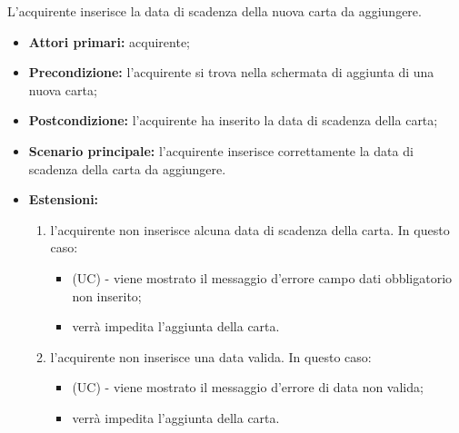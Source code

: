L'acquirente inserisce la data di scadenza della nuova carta da aggiungere.
\begin{itemize}
    \item \textbf{Attori primari:} acquirente;
    \item \textbf{Precondizione:} l'acquirente si trova nella schermata di aggiunta di una nuova carta;
    \item \textbf{Postcondizione:} l'acquirente ha inserito la data di scadenza della carta;
    \item \textbf{Scenario principale:} l'acquirente inserisce correttamente la data di scadenza della carta da aggiungere.
    \item \textbf{Estensioni:}
    \begin{enumerate}[label=\lett]
        \item l'acquirente non inserisce alcuna data di scadenza della carta. In questo caso:
        \begin{itemize}
            \item (UC) - viene mostrato il messaggio d'errore campo dati obbligatorio non inserito;
            \item verrà impedita l'aggiunta della carta.
        \end{itemize}
        \item l'acquirente non inserisce una data valida. In questo caso:
        \begin{itemize}
            \item (UC) - viene mostrato il messaggio d'errore di data non valida;
            \item verrà impedita l'aggiunta della carta.
        \end{itemize}
    \end{enumerate}
\end{itemize}


